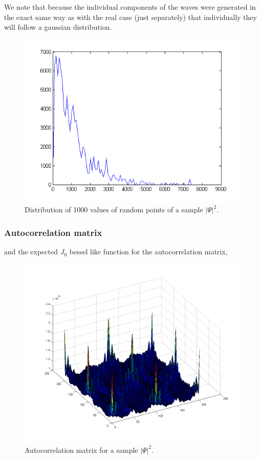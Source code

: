 \documentclass[12pt]{article}
\begin{document}
We note that because the individual components of the waves were generated in the exact same way as with the real case (just separately) that individually they will follow a gaussian distribution.

\begin{figure}[hpt]
	\centering
		\includegraphics[width=1.00\textwidth]{randomdist1000p50by50wav1000C.png}
	\caption{Distribution of 1000 values of random points of a sample $|\Psi|^{2}$.}
	\label{fig:randomdist1000p50by50wav1000C}
\end{figure}

\pagebreak

\subsubsection{Autocorrelation matrix}

and the expected $J_{0}$ bessel like function for the autocorrelation matrix,

\begin{figure}[hpt]
	\centering
		\includegraphics[width=1.00\textwidth]{autocorr50by50wav1000C.png}
	\caption{Autocorrelation matrix for a sample $|\Psi|^{2}$.}
	\label{fig:autocorr50by50wav1000C}
\end{figure}
\end{document}
